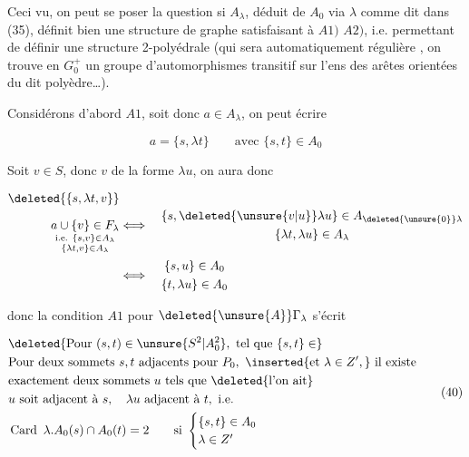 
Ceci vu, on peut se poser la question si $A_\lambda$, déduit de $A_0$ via $\lambda$ comme dit dans (35), définit bien une structure de graphe satisfaisant à $A1)$ $A2)$, i.e. permettant de définir une structure 2-polyédrale (qui sera automatiquement régulière \deleted{\unsure{)}}, on trouve en $G_0^+$  un groupe d'automorphismes transitif sur l'ens des arêtes orientées du dit polyèdre\ldots).

Considérons d'abord $A1$, soit donc  $a\in A_\lambda$, on peut écrire

\[
a=\{s,\lambda t\}\qquad\text{avec }\{s,t\}\in A_0
\]

Soit $v\in S$, donc $v$ de la forme $\lambda u$, on aura donc

\[
\begin{aligned}
\deleted{\{s,\lambda t,v\}}&\\[-2pt]
{\underset{\substack{\text{i.e. }\{s,v\}\in A_\lambda\\\{\lambda t,v\}\in A_\lambda}}{a\cup\{v\}\in F_\lambda}}
 &\Longleftrightarrow\quad
 \begin{gathered}\{s,\deleted{\unsure{v|u}}\lambda u\}\in A_{\deleted{\unsure{0}}\lambda}\\
 \{\lambda t,\lambda u\}\in A_\lambda\end{gathered}\\
 &\Longleftrightarrow\quad
 \begin{gathered}\{s,u\}\in A_0\\\{t,\lambda u\}\in A_0\end{gathered}
\end{aligned}
\]

donc la condition $A1$ pour $\deleted{\unsure{A}}\Gamma_\lambda$ s'écrit

\[
\begin{aligned}
&\deleted{\text{Pour }(s,t)\in\unsure{S^2|A_0^2},\ \text{tel que }\{s,t\}\in}\\
&\text{Pour deux sommets }s,t\text{ adjacents pour }P_0,\ \inserted{\text{et }\lambda\in Z',}\text{ il existe}\\
&\text{exactement deux sommets }u\text{ tels que }\deleted{\text{l'on ait}}\\
&u\text{ soit adjacent à }s,\quad\lambda u\text{ adjacent à }t,\ \text{i.e.}\\
&\operatorname{Card}\ \lambda.A_0(s)\cap A_0(t)=2\qquad \text{si }
 \begin{cases}\{s,t\}\in A_0\\\lambda\in Z'\end{cases}
\end{aligned}\tag*{$(40)$}
\]

